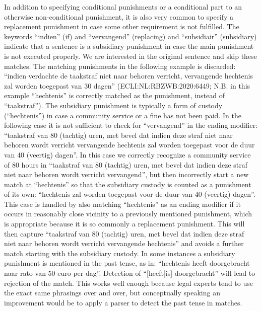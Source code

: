 \documentclass[a4paper]{article}
\begin{document}
In addition to specifying conditional punishments or a conditional part to an otherwise non-conditional punishment, it is also very common to specify a replacement punishment in case some other requirement is not fulfilled.
The keywords ``indien'' (if) and ``vervangend'' (replacing) and ``subsidiair'' (subsidiary) indicate that a sentence is a subsidiary punishment in case the main punishment is not executed properly.
We are interested in the original sentence and skip these matches.
The matching punishments in the following example is discarded:
``indien verdachte de taakstraf niet naar behoren verricht, vervangende hechtenis zal worden toegepast van 30 dagen'' (ECLI:NL:RBZWB:2020:6449; N.B. in this example ``hechtenis'' is correctly matched as the punishment, instead of ``taakstraf'').
The subsidiary punishment is typically a form of custody (``hechtenis'') in case a community service or a fine has not been paid.
In the following case it is not sufficient to check for ``vervangend'' in the ending modifier:
``taakstraf van 80 (tachtig) uren, met bevel dat indien deze straf niet naar behoren wordt verricht vervangende hechtenis zal worden toegepast voor de duur van 40 (veertig) dagen''.
In this case we correctly recognize a community service of 80 hours in ``taakstraf van 80 (tachtig) uren, met bevel dat indien deze straf niet naar behoren wordt verricht vervangend'', but then incorrectly start a new match at ``hechtenis'' so that the subsidiary custody is counted as a punishment of its own: ``hechtenis zal worden toegepast voor de duur van 40 (veertig) dagen''.
This case is handled by also matching ``hechtenis'' as an ending modifier if it occurs in reasonably close vicinity to a previously mentioned punishment, which is appropriate because it is so commonly a replacement punishment.
This will then capture ``taakstraf van 80 (tachtig) uren, met bevel dat indien deze straf niet naar behoren wordt verricht vervangende hechtenis'' and avoids a further match starting with the subsidiary custody.
In some instances a subsidiary punishment is mentioned in the past tense, as in: ``hechtenis heeft doorgebracht naar rato van 50 euro per dag''.
Detection of ``[heeft|is] doorgebracht'' will lead to rejection of the match.
This works well enough because legal experts tend to use the exact same phrasings over and over, but conceptually speaking an improvement would be to apply a parser to detect the past tense in matches.
\end{document}
